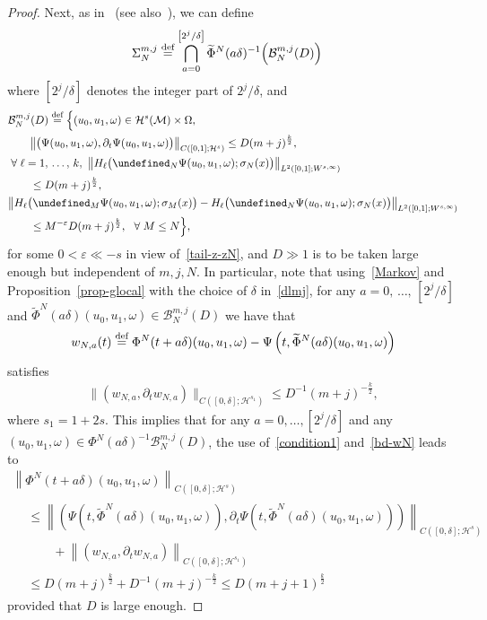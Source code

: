 \documentclass[AHL,Unicode,longabstracts,published]{cedram}
\newcommand{\deff}{\overset{\textup{def}}{=}}
\let\P= \undefined
\newcommand{\P}{\mathbf{P}}
\newcommand{\B}{\mathcal{B}}
\newcommand{\M}{\mathcal{M}}
\renewcommand{\H}{\mathcal{H}}
\newcommand{\dl}{\delta}
\newcommand{\eps}{\varepsilon}
\newcommand{\s}{\sigma}
\newcommand{\Si}{\Sigma}
\newcommand{\wt}{\widetilde}
\newcommand{\dt}{\partial_t}
\renewcommand{\o}{\omega}
\renewcommand{\O}{\Omega}
\let\oldforall\forall
\renewcommand*{\forall}{\mathrel{\oldforall}}
\begin{document}
\begin{proof}
Next, as in~\cite{BTT2} (see also~\cite{BO94,BO96}), we can define
\begin{align*}
\Si_{N}^{m,j} &
\deff \bigcap_{a=0}^{\left[2^j/\dl\right]}\wt\Phi^N(a\dl)^{-1}\Big(\B_N^{m,j}(D)\Big)
\end{align*}
where $[2^j/\dl]$ denotes the integer part of $2^j/\dl$, and
\begin{align}
&\B_N^{m,j}(D)
\deff \Big\{(u_0,u_1,\o)\in \H^s(\M)\times\O,\label{condition1}\\
&\qquad\big\|\big(\Psi(u_0,u_1,\o),\dt\Psi(u_0,u_1,\o)\big)\big\|_{C([0,1];\H^s)} \le D(m+j)^{\frac{k}2},\notag
\\
&\forall \ell=1,\,\dots,\,k,~\big\|H_{\ell}\big(\P_N\Psi(u_0,u_1,\o);\s_N(x)\big)\big\|_{L^2([0,1];W^{s,\infty})}\label{condition2}\\
&\qquad\le D(m+j)^{\frac{k}2}\notag,
\\
&\big\|H_{\ell}\big(\P_M\Psi(u_0,u_1,\o);\s_M(x)\big)\label{condition3}
-H_{\ell}\big(\P_N\Psi(u_0,u_1,\o);\s_N(x)\big)\big\|_{L^2([0,1]; W^{s,\infty})}\\
&\qquad\notag\le M^{-\eps}D(m+j)^{\frac{k}2},~~\forall M\le N\Big\},\notag
\end{align}
for some $0<\eps\ll -s$ in view of~\eqref{tail-z-zN}, and $D\gg 1$ is to be taken large enough but independent of $m,j,N$. In particular, note that using~\eqref{Markov} and Proposition~\ref{prop-glocal} with the choice of $\dl$ in~\eqref{dlmj}, for any $a=0,\,\dots,\,[2^j/\dl]$ and $\wt\Phi^N(a\dl)(u_0,u_1,\o)\in \B_N^{m,j}(D)$ we have that
\begin{align*}
w_{N,a}(t)
\deff \Phi^N(t+a\dl)(u_0,u_1,\o)-\Psi\left(t,\wt\Phi^N(a\dl)(u_0,u_1,\o)\right)
\end{align*}
satisfies
\begin{align}\label{bd-wN}
\|(w_{N,a},\dt w_{N,a})\|_{C\left([0,\dl];\H^{s_1}\right)}\le D^{-1}(m+j)^{-\frac{k}2},
\end{align}
where $s_1=1+2s$. This implies that for any $a=0,\dots,[2^j/\dl]$ and any $(u_0,u_1,\o)\in \Phi^N(a\dl)^{-1}\B_N^{m,j}(D)$, the use of~\eqref{condition1} and~\eqref{bd-wN} leads to
\begin{multline}\label{bduN}
\left\|\Phi^N(t+a\dl)(u_0,u_1,\o)\right\|_{C([0,\dl];\H^{s})}\\
\begin{aligned}
&\le \left\|\left(\Psi\left(t,\wt\Phi^N(a\dl)(u_0,u_1,\o)\right),\dt\Psi\left(t,\wt\Phi^N(a\dl)(u_0,u_1,\o)\right)\right)\right\|_{C([0,\dl];\H^s)}\\
&\qquad+\left\|\left(w_{N,a},\dt w_{N,a}\right)\right\|_{C\left([0,\dl];\H^{s_1}\right)}\\
&\le D(m+j)^{\frac{k}2}+D^{-1}(m+j)^{-\frac{k}2} \le D(m+j+1)^{\frac{k}2}
\end{aligned}
\end{multline}
provided that $D$ is large enough.


\end{proof}
\end{document}
